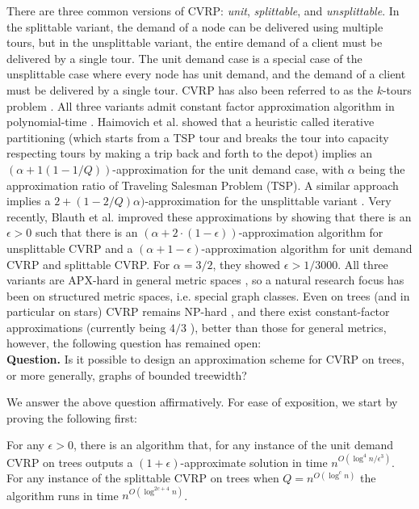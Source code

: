 \documentclass[twoside,leqno]{article}
\newcommand{\eps}{\epsilon}
\begin{document}
There are three common versions of CVRP: \emph{unit}, \emph{splittable}, and \emph{unsplittable}. In the splittable variant, the demand of a node can be delivered using multiple tours, but in the unsplittable variant, the entire demand of a client must be delivered by a single tour. The unit demand case is a special case of the unsplittable case where every node has unit demand, and the demand of a client must be delivered by a single tour. CVRP has also been referred to as the $k$-tours problem \cite{Arora-Euclidean-PTAS, stoc/AsanoKTT97}.
 All three variants admit constant factor approximation algorithm in polynomial-time \cite{Haimovich-Kan}. Haimovich et al. \cite{Haimovich-Kan} showed that a heuristic
 called iterative partitioning (which starts from a TSP tour and breaks the tour into capacity respecting tours by making a trip back and  forth to the depot) implies an $(\alpha+1(1-1/Q))$-approximation
 for the unit demand case, with $\alpha$ being the approximation ratio of Traveling Salesman Problem (TSP).
 A similar approach implies a
$2 + (1 - 2/Q)\alpha)$-approximation for the unsplittable variant \cite{ALTINKEMER1987149}. Very recently, Blauth et al. \cite{Vygen} improved these approximations by showing that there is an $\eps > 0$ such that there is an $(\alpha + 2 \cdot (1 - \eps))$-approximation algorithm for unsplittable CVRP and a $(\alpha + 1 - \eps)$-approximation algorithm for unit demand CVRP and splittable CVRP. For $\alpha = 3/2$, they showed $\eps > 1/3000$.
 All three variants are APX-hard in general metric spaces \cite{Papadimitrio-Yannakakis}, so a natural research focus has been on structured metric spaces, i.e. special graph classes. Even on trees (and in particular on stars) CVRP remains NP-hard \cite{Labbe-Mercure}, and there exist constant-factor approximations (currently being $4/3$ \cite{Becker18}), better than those for general metrics, however, the following question has remained open:\\
\textbf{Question.} Is it possible to design an approximation scheme for CVRP on trees, or more generally, graphs of bounded treewidth?


We answer the above question affirmatively. For ease of exposition, we start by proving the following first:
\begin{theorem}\label{thm:tree}
For any $\eps > 0$, there is an algorithm that, for any instance of the unit demand CVRP on trees outputs a $(1 + \eps)$-approximate solution in time $n^{O(\log^4 n/\eps^3)}$.
For any instance of the splittable CVRP on trees when $Q = n^{O(\log^c n)}$ the algorithm
runs in time $n^{O(\log^{2c + 4}n)}$.
\end{theorem}
\end{document}
